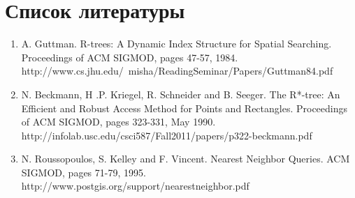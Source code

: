 \documentclass{article}
\begin{document}
\section{Список литературы}
\begin{enumerate}
    \item A. Guttman. R-trees: A Dynamic Index Structure for Spatial Searching. Proceedings of ACM SIGMOD, pages 47-57, 1984. http://www.cs.jhu.edu/~misha/ReadingSeminar/Papers/Guttman84.pdf

    \item N. Beckmann, H .P. Kriegel, R. Schneider and B. Seeger. The R*-tree: An Efficient and Robust Access Method for Points and Rectangles. Proceedings of ACM SIGMOD, pages 323-331, May 1990. http://infolab.usc.edu/csci587/Fall2011/papers/p322-beckmann.pdf

    \item N. Roussopoulos, S. Kelley and F. Vincent. Nearest Neighbor Queries. ACM SIGMOD, pages 71-79, 1995. http://www.postgis.org/support/nearestneighbor.pdf
\end{enumerate}
\end{document}
